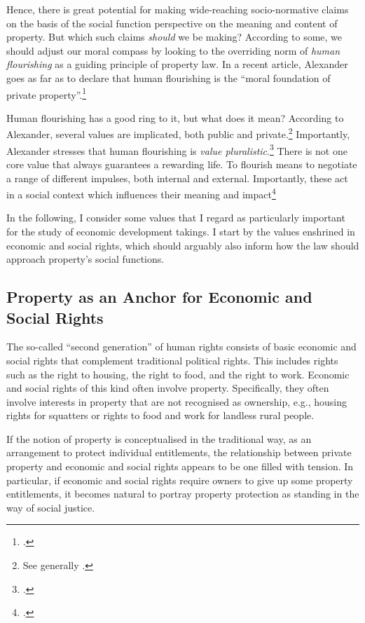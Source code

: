 Hence, there is great potential for making wide-reaching socio-normative claims on the basis of the social function perspective on the meaning and content of property. But which such claims {\it should} we be making? According to some, we should adjust our moral compass by looking to the overriding norm of {\it human flourishing} as a guiding principle of property law. In a recent article, Alexander goes as far as to declare that human flourishing is the ``moral foundation of private property''.\footcite[1261]{alexander14} 

Human flourishing has a good ring to it, but what does it mean? According to Alexander, several values are implicated, both public and private.\footnote{See generally \cite{alexander14,alexander11}.} Importantly, Alexander stresses that human flourishing is {\it value pluralistic}.\footnote{\cite[750-751]{alexander09}.} There is not one core value that always guarantees a rewarding life. To flourish means to negotiate a range of different impulses, both internal and external. Importantly, these act in a social context which influences their meaning and impact\footcite[1035-1052]{alexander11}

In the following, I consider some values that I regard as particularly important for the study of economic development takings. I start by the values enshrined in economic and social rights, which should arguably also inform how the law should approach property's social functions.

\subsection{Property as an Anchor for Economic and Social Rights}

The so-called ``second generation'' of human rights consists of basic economic and social rights that complement traditional political rights. This includes rights such as the right to housing, the right to food, and the right to work. Economic and social rights of this kind often involve property. Specifically, they often involve interests in property that are not recognised as ownership, e.g., housing rights for squatters or rights to food and work for landless rural people. 

If the notion of property is conceptualised in the traditional way, as an arrangement to protect individual entitlements, the relationship between private property and economic and social rights appears to be one filled with tension. In particular, if economic and social rights require owners to give up some property entitlements, it becomes natural to portray property protection as standing in the way of social justice. 

